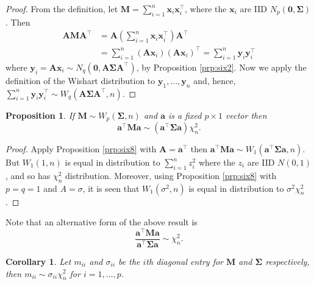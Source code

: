 \documentclass[]{book}
\newtheorem{corollary}{Corollary}[chapter]
\newtheorem{proposition}{Proposition}[chapter]
\theoremstyle{definition}
\theoremstyle{definition}
\theoremstyle{definition}
\theoremstyle{remark}
\begin{document}
\begin{proof}
{}From the definition, let \(\boldsymbol M= \sum_{i=1}^n \boldsymbol x_i \boldsymbol x_i^\top\), where the \(\boldsymbol x_i\) are
IID \(N_p(\boldsymbol 0,\boldsymbol \Sigma)\). Then
\begin{align*}
\boldsymbol A\boldsymbol M\boldsymbol A^\top &= \boldsymbol A\left(\sum_{i=1}^n \boldsymbol x_i \boldsymbol x_i^\top \right)\boldsymbol A^\top\\
 &= \sum_{i=1}^n (\boldsymbol A\boldsymbol x_i)(\boldsymbol A\boldsymbol x_i)^\top = \sum_{i=1}^n \boldsymbol y_i \boldsymbol y_i^\top
\end{align*}
where \(\boldsymbol y_i = \boldsymbol A\boldsymbol x_i \sim N_q(\boldsymbol 0,\boldsymbol A\boldsymbol \Sigma\boldsymbol A^\top)\), by Proposition \ref{prp:six2}. Now we apply the definition of the Wishart distribution to \(\boldsymbol y_1,\ldots,\boldsymbol y_n\) and, hence, \(\sum_{i=1}^n \boldsymbol y_i \boldsymbol y_i^\top \sim W_q\left(\boldsymbol A\boldsymbol \Sigma\boldsymbol A^\top, n \right)\).
\end{proof}

\begin{proposition}
\protect\hypertarget{prp:six9}{}{\label{prp:six9} }If \(\boldsymbol M\sim W_p(\boldsymbol \Sigma,n)\) and \(\boldsymbol a\) is a fixed \(p \times 1\) vector then
\[ \boldsymbol a^\top \boldsymbol M\boldsymbol a\sim \left(\boldsymbol a^\top \boldsymbol \Sigma\boldsymbol a\right)\chi_n^2.\]
\end{proposition}

\begin{proof}
{}Apply Proposition \ref{prp:six8} with \(\boldsymbol A= \boldsymbol a^\top\) then \(\boldsymbol a^\top \boldsymbol M\boldsymbol a\sim W_1( \boldsymbol a^\top \boldsymbol \Sigma\boldsymbol a, n)\). But \(W_1(1,n)\) is equal in distribution to \(\sum_{i=1}^n z_i^2\) where the \(z_i\) are IID \(N(0,1)\), and so has \(\chi_n^2\) distribution. Moreover, using Proposition \ref{prp:six8} with \(p=q=1\) and \(A=\sigma\), it is seen that \(W_1(\sigma^2,n)\) is equal in distribution to \(\sigma^2 \chi_n^2\).
\end{proof}

Note that an alternative form of the above result is
\[\frac{ \boldsymbol a^\top \boldsymbol M\boldsymbol a}{ \boldsymbol a^\top \boldsymbol \Sigma\boldsymbol a} \sim \chi_n^2.\]

\begin{corollary}
\protect\hypertarget{cor:csix4}{}{\label{cor:csix4} }Let \(m_{ii}\) and \(\sigma_{ii}\) be the \(i\)th diagonal entry for \(\boldsymbol M\) and \(\boldsymbol \Sigma\) respectively, then \(m_{ii} \sim \sigma_{ii} \chi^2_n\) for \(i=1,\ldots,p\).
\end{corollary}
\end{document}
